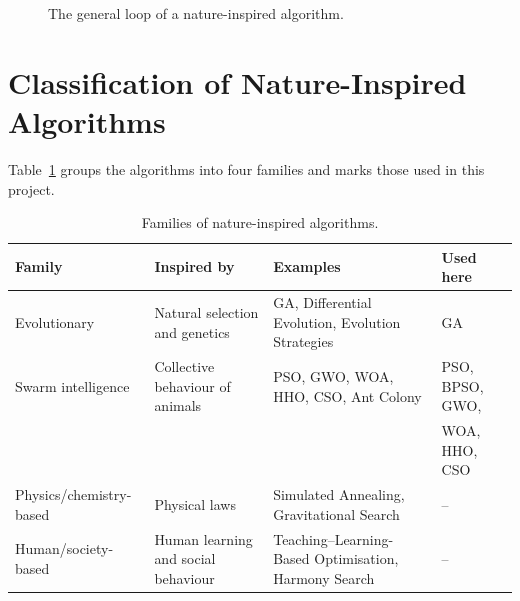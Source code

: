 \documentclass[12pt,a4paper]{report}
\begin{document}
\begin{figure}[H]
\centering
{}
\caption{The general loop of a nature-inspired algorithm.}
\label{fig:loop}
\end{figure}

\section{Classification of Nature-Inspired Algorithms}
Table~\ref{tab:families} groups the algorithms into four families and marks those used in this project.

\begin{table}[H]
\centering
\caption{Families of nature-inspired algorithms.}
\label{tab:families}
\small
\begin{tabularx}{\textwidth}{|l|X|X|l|}
\hline
\textbf{Family} & \textbf{Inspired by} & \textbf{Examples} & \textbf{Used here} \\
\hline
Evolutionary & Natural selection and genetics & GA, Differential Evolution, Evolution Strategies & GA \\
\hline
Swarm intelligence & Collective behaviour of animals & PSO, GWO, WOA, HHO, CSO, Ant Colony & PSO, BPSO, GWO, \\
 & & & WOA, HHO, CSO \\
\hline
Physics/chemistry-based & Physical laws & Simulated Annealing, Gravitational Search & -- \\
\hline
Human/society-based & Human learning and social behaviour & Teaching--Learning-Based Optimisation, Harmony Search & -- \\
\hline
\end{tabularx}
\end{table}
\end{document}
